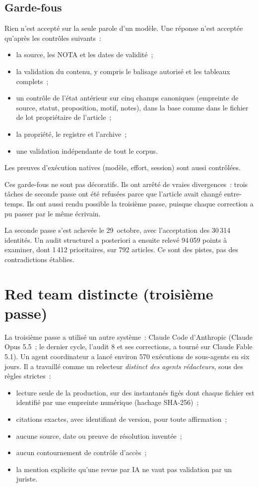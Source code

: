 \documentclass[11pt,a4paper]{article}
\begin{document}
\subsection{Garde-fous}

Rien n'est accepté sur la seule parole d'un modèle. Une réponse n'est acceptée qu'après les contrôles suivants~:
\begin{itemize}
  \item la source, les NOTA et les dates de validité~;
  \item la validation du contenu, y compris le balisage autorisé et les tableaux complets~;
  \item un contrôle de l'état antérieur sur cinq champs canoniques (empreinte de source, statut, proposition, motif, notes), dans la base comme dans le fichier de lot propriétaire de l'article~;
  \item la propriété, le registre et l'archive~;
  \item une validation indépendante de tout le corpus.
\end{itemize}
Les preuves d'exécution natives (modèle, effort, session) sont aussi contrôlées.

Ces garde-fous ne sont pas décoratifs. Ils ont arrêté de vraies divergences~: trois tâches de seconde passe ont été refusées parce que l'article avait changé entre-temps. Ils ont aussi rendu possible la troisième passe, puisque chaque correction a pu passer par le même écrivain.

La seconde passe s'est achevée le 29~octobre, avec l'acceptation des 30\,314 identités. Un audit structurel a posteriori a ensuite relevé 94\,059 points à examiner, dont 1\,412 prioritaires, sur 792 articles. Ce sont des pistes, pas des contradictions établies.

\section{Red team distincte (troisième passe)}
\label{sec:redteam}

La troisième passe a utilisé un autre système~: Claude Code d'Anthropic (Claude Opus 5.5~; le dernier cycle, l'audit 8 et ses corrections, a tourné sur Claude Fable 5.1). Un agent coordinateur a lancé environ 570 exécutions de sous-agents en six jours. Il a travaillé comme un relecteur \emph{distinct des agents rédacteurs}, sous des règles strictes~:
\begin{itemize}
  \item lecture seule de la production, sur des instantanés figés dont chaque fichier est identifié par une empreinte numérique (hachage SHA-256)~;
  \item citations exactes, avec identifiant de version, pour toute affirmation~;
  \item aucune source, date ou \og preuve de résolution \fg{} inventée~;
  \item aucun contournement de contrôle d'accès~;
  \item la mention explicite qu'une revue par IA ne vaut pas validation par un juriste.
\end{itemize}
\end{document}
